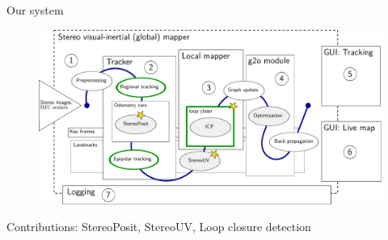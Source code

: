 \documentclass[11pt]{beamer}
\begin{document}
\begin{frame}{Our system}
\begin{figure}[!htb]
\centering
\includegraphics[width=\textwidth]{figures/approach_softwaredesign/pipeline.pdf}
\end{figure}
Contributions: StereoPosit, StereoUV, Loop closure detection
\end{frame}

\end{document}
